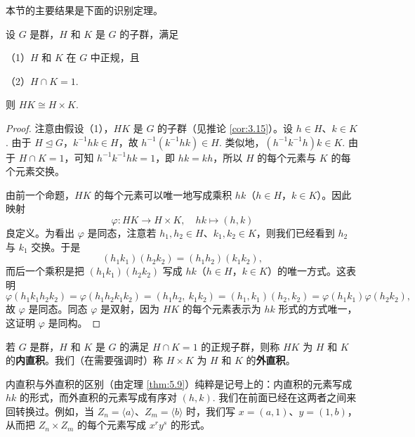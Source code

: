 本节的主要结果是下面的识别定理。

\begin{theorem}\label{thm:5.9}
设 \(G\) 是群，\(H\) 和 \(K\) 是 \(G\) 的子群，满足

（1）\(H\) 和 \(K\) 在 \(G\) 中正规，且

（2）\(H \cap K = 1\).

则 \(HK \cong H \times K\).
\end{theorem}

\begin{proof}
注意由假设（1），\(HK\) 是 \(G\) 的子群（见推论 \ref{cor:3.15}）。设 \(h \in H\)、\(k \in K\). 由于 \(H \trianglelefteq G\)，\(k^{-1}hk \in H\)，故 \(h^{-1}(k^{-1}hk) \in H\). 类似地，\((h^{-1}k^{-1}h)k \in K\). 由于 \(H \cap K = 1\)，可知 \(h^{-1}k^{-1}hk = 1\)，即 \(hk = kh\)，所以 \(H\) 的每个元素与 \(K\) 的每个元素交换。

由前一个命题，\(HK\) 的每个元素可以唯一地写成乘积 \(hk\)（\(h \in H\)，\(k \in K\)）。因此映射
\[
\varphi : HK \to H \times K, \quad hk \mapsto (h, k)
\]
良定义。为看出 \(\varphi\) 是同态，注意若 \(h_1, h_2 \in H\)、\(k_1, k_2 \in K\)，则我们已经看到 \(h_2\) 与 \(k_1\) 交换。于是
\[
(h_1k_1)(h_2k_2) = (h_1h_2)(k_1k_2),
\]
而后一个乘积是把 \((h_1k_1)(h_2k_2)\) 写成 \(hk\)（\(h \in H\)，\(k \in K\)）的唯一方式。这表明
\[
\varphi(h_1k_1h_2k_2) = \varphi(h_1h_2k_1k_2) = (h_1h_2,\ k_1k_2) = (h_1, k_1)(h_2, k_2) = \varphi(h_1k_1)\varphi(h_2k_2),
\]
故 \(\varphi\) 是同态。同态 \(\varphi\) 是双射，因为 \(HK\) 的每个元素表示为 \(hk\) 形式的方式唯一，这证明 \(\varphi\) 是同构。
\end{proof}

\begin{definition}
若 \(G\) 是群，\(H\) 和 \(K\) 是 \(G\) 的满足 \(H \cap K = 1\) 的正规子群，则称 \(HK\) 为 \(H\) 和 \(K\) 的\textbf{内直积}。我们（在需要强调时）称 \(H \times K\) 为 \(H\) 和 \(K\) 的\textbf{外直积}。
\end{definition}

内直积与外直积的区别（由定理 \ref{thm:5.9}）纯粹是记号上的：内直积的元素写成 \(hk\) 的形式，而外直积的元素写成有序对 \((h, k)\). 我们在前面已经在这两者之间来回转换过。例如，当 \(Z_n = \langle a \rangle\)、\(Z_m = \langle b \rangle\) 时，我们写 \(x = (a, 1)\)、\(y = (1, b)\)，从而把 \(Z_n \times Z_m\) 的每个元素写成 \(x^r y^s\) 的形式。

